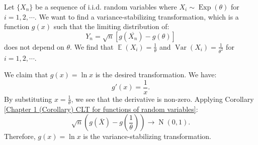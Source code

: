 \documentclass{huhtakm-template-book-v2}
\DeclareMathOperator{\E}{\mathbb{E}}
\DeclareMathOperator{\Var}{Var}
\DeclareMathOperator{\Exp}{Exp}
\DeclareMathOperator{\N}{N}
\begin{document}
    \begin{eg}
        Let $\{X_{n}\}$ be a sequence of i.i.d. random variables where $X_{i} \sim \Exp(\theta)$ for $i = 1, 2, \cdots$. We want to find a variance-stabilizing transformation, which is a function $g(x)$ such that the limiting distribution of:
        \begin{equation*}
            Y_{n} = \sqrt{n}[g(\overline{X_{n}}) - g(\theta)]
        \end{equation*}
        does not depend on $\theta$. We find that $\E(X_{i}) = \frac{1}{\theta}$ and $\Var(X_{i}) = \frac{1}{\theta^{2}}$ for $i = 1, 2, \cdots$. 
        
        We claim that $g(x) = \ln{x}$ is the desired transformation. We have:
        \begin{equation*}
            g'(x) = \frac{1}{x}.
        \end{equation*}
        By substituting $x = \frac{1}{\theta}$, we see that the derivative is non-zero. Applying Corollary \ref{Chapter 1 (Corollary) CLT for functions of random variables}:
        \begin{equation*}
            \sqrt{n}\left(g(\overline{X}) - g\left(\frac{1}{\theta}\right)\right) \to \N(0, 1).
        \end{equation*}
        Therefore, $g(x) = \ln{x}$ is the variance-stabilizing transformation.
    \end{eg}
    \newpage
    
\end{document}
